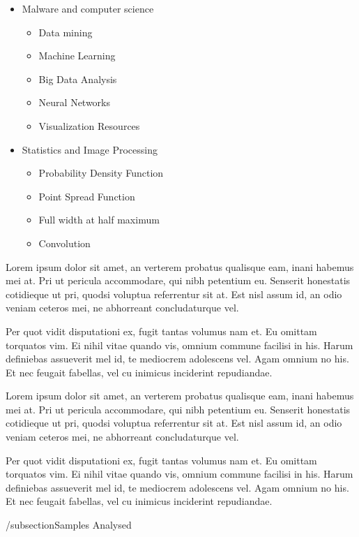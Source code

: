 \documentclass[11pt,fleqn]{book} %
\begin{document}
\begin{itemize}
	\item Malware and computer science
    	\begin{itemize}
        	\item Data mining
            \item Machine Learning
            \item Big Data Analysis
            \item Neural Networks
            \item Visualization Resources
        \end{itemize}
    \item Statistics and Image Processing
    	\begin{itemize}
        	\item Probability Density Function
            \item Point Spread Function
            \item Full width at half maximum
            \item Convolution
        \end{itemize}
\end{itemize}

Lorem ipsum dolor sit amet, an verterem probatus qualisque eam, inani habemus mei at. Pri ut pericula accommodare, qui nibh petentium eu. Senserit honestatis cotidieque ut pri, quodsi voluptua referrentur sit at. Est nisl assum id, an odio veniam ceteros mei, ne abhorreant concludaturque vel.

Per quot vidit disputationi ex, fugit tantas volumus nam et. Eu omittam torquatos vim. Ei nihil vitae quando vis, omnium commune facilisi in his. Harum definiebas assueverit mel id, te mediocrem adolescens vel. Agam omnium no his. Et nec feugait fabellas, vel cu inimicus inciderint repudiandae.

Lorem ipsum dolor sit amet, an verterem probatus qualisque eam, inani habemus mei at. Pri ut pericula accommodare, qui nibh petentium eu. Senserit honestatis cotidieque ut pri, quodsi voluptua referrentur sit at. Est nisl assum id, an odio veniam ceteros mei, ne abhorreant concludaturque vel.

Per quot vidit disputationi ex, fugit tantas volumus nam et. Eu omittam torquatos vim. Ei nihil vitae quando vis, omnium commune facilisi in his. Harum definiebas assueverit mel id, te mediocrem adolescens vel. Agam omnium no his. Et nec feugait fabellas, vel cu inimicus inciderint repudiandae.

/subsection{Samples Analysed}
\end{document}
